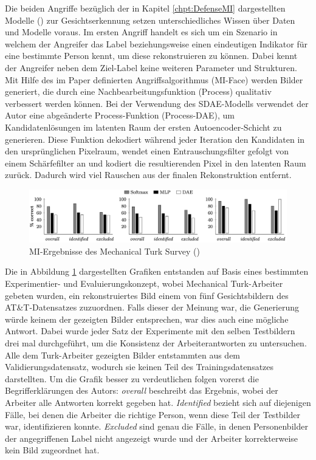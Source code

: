 Die beiden Angriffe bezüglich der in Kapitel \ref{chpt:DefenseMI} dargestellten Modelle (\cite[S. 7 ff.]{fredrikson_model_2015}) zur Gesichtserkennung setzen unterschiedliches Wissen über Daten und Modelle voraus. Im ersten Angriff handelt es sich um ein Szenario in welchem der Angreifer das Label beziehungsweise einen eindeutigen Indikator für eine bestimmte Person kennt, um diese rekonstruieren zu können. Dabei kennt der Angreifer neben dem Ziel-Label keine weiteren Parameter und Strukturen. Mit Hilfe des im Paper definierten Angriffsalgorithmus (MI-Face) werden Bilder generiert, die durch eine Nachbearbeitungsfunktion (Process) qualitativ verbessert werden können. Bei der Verwendung des SDAE-Modells verwendet der Autor eine abgeänderte Process-Funktion (Process-DAE), um Kandidatenlösungen im latenten Raum der ersten Autoencoder-Schicht zu generieren. Diese Funktion dekodiert während jeder Iteration den Kandidaten in den ursprünglichen Pixelraum, wendet einen Entrauschungsfilter gefolgt von einem Schärfefilter an und kodiert die resultierenden Pixel in den latenten Raum zurück. Dadurch wird viel Rauschen aus der finalen Rekonstruktion entfernt. 
\begin{figure}[H]
	\centering
	\includegraphics[width=1\linewidth]{Bilder/frederikson_2015_2.png}
	\caption{MI-Ergebnisse des \glqq Mechanical Turk Survey\grqq{} (\cite[S. 10, Figure 9]{fredrikson_model_2015})}
	\label{img:frederikson_2015_evaluation2}
\end{figure}
Die in Abbildung \ref{img:frederikson_2015_evaluation2} dargestellten Grafiken entstanden auf Basis eines bestimmten Experimentier- und Evaluierungskonzept, wobei Mechanical Turk-Arbeiter gebeten wurden, ein rekonstruiertes Bild einem von fünf Gesichtsbildern des AT\&T-Datensatzes zuzuordnen. Falls dieser der Meinung war, die Generierung würde keinem der gezeigten Bilder entsprechen, war dies auch eine mögliche Antwort. Dabei wurde jeder Satz der Experimente mit den selben Testbildern drei mal durchgeführt, um die Konsistenz der Arbeiterantworten zu untersuchen. Alle dem Turk-Arbeiter gezeigten Bilder entstammten aus dem Validierungsdatensatz, wodurch sie keinen Teil des Trainingsdatensatzes darstellten. Um die Grafik besser zu verdeutlichen folgen vorerst die Begrifferklärungen des Autors: \textit{overall} beschreibt das Ergebnis, wobei der Arbeiter alle Antworten korrekt gegeben hat. \textit{Identified} bezieht sich auf diejenigen Fälle, bei denen die Arbeiter die richtige Person, wenn diese Teil der Testbilder war, identifizieren konnte. \textit{Excluded} sind genau die Fälle, in denen Personenbilder der angegriffenen Label nicht angezeigt wurde und der Arbeiter korrekterweise kein Bild zugeordnet hat.
